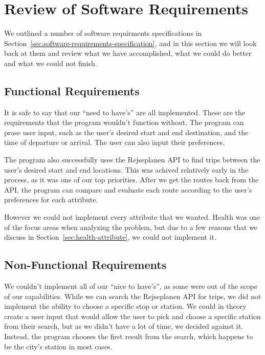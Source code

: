 \section{Review of Software Requirements}\label{sec:review-of-software-requirements}

We outlined a number of software requirments specifications in Section~\ref{sec:software-requirements-specification},
and in this section we will look back at them and review what we have accomplished, what we could do better and what we
could not finish.

\subsection{Functional Requirements}\label{subsec:functional-requirements}

It is safe to say that our ``need to have's'' are all implemented.
These are the requirements that the program wouldn't function without.
The program can prase user input, such as the user's desired start and end destination, and the time of departure or
arrival.
The user can also input their preferences.

The program also successfully uses the Rejseplanen API to find trips between the user's desired start and end locations.
This was achived relatively early in the process, as it was one of our top priorities.
After we get the routes back from the API, the program can compare and evaluate each route according to the user's
preferences for each attribute.

However we could not implement every attribute that we wanted.
Health was one of the focus areas when analyzing the problem, but due to a few reasons that we discuss in
Section~\ref{sec:health-attribute}, we could not implement it.

\subsection{Non-Functional Requirements}\label{subsec:non-functional-requirements}

We couldn't implement all of our ``nice to have's'', as some were out of the scope of our capabilities.
While we can search the Rejseplanen API for trips, we did not implement the ability to choose a specific stop or station.
We could in theory create a user input that would allow the user to pick and choose a specific station from their search,
but as we didn't have a lot of time, we decided against it.
Instead, the program chooses the first result from the search, which happens to be the city's station in most cases.

